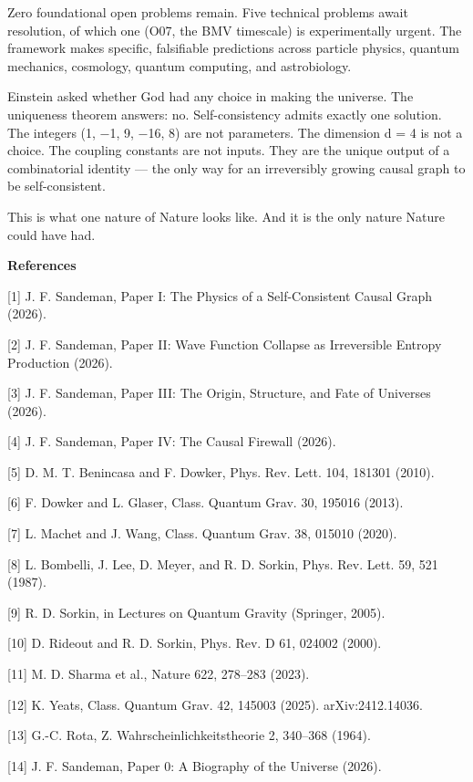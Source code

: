 \documentclass[12pt,a4paper]{article}
\begin{document}
Zero foundational open problems remain. Five technical problems await
resolution, of which one (O07, the BMV timescale) is experimentally
urgent. The framework makes specific, falsifiable predictions across
particle physics, quantum mechanics, cosmology, quantum computing, and
astrobiology.

Einstein asked whether God had any choice in making the universe. The
uniqueness theorem answers: no. Self-consistency admits exactly one
solution. The integers (1, −1, 9, −16, 8) are not parameters. The
dimension d = 4 is not a choice. The coupling constants are not inputs.
They are the unique output of a combinatorial identity --- the only way
for an irreversibly growing causal graph to be self-consistent.

This is what one nature of Nature looks like. And it is the only nature
Nature could have had.

\textbf{References}

{[}1{]} J. F. Sandeman, Paper I: The Physics of a Self-Consistent Causal
Graph (2026).

{[}2{]} J. F. Sandeman, Paper II: Wave Function Collapse as Irreversible
Entropy Production (2026).

{[}3{]} J. F. Sandeman, Paper III: The Origin, Structure, and Fate of
Universes (2026).

{[}4{]} J. F. Sandeman, Paper IV: The Causal Firewall (2026).

{[}5{]} D. M. T. Benincasa and F. Dowker, Phys. Rev. Lett. 104, 181301
(2010).

{[}6{]} F. Dowker and L. Glaser, Class. Quantum Grav. 30, 195016 (2013).

{[}7{]} L. Machet and J. Wang, Class. Quantum Grav. 38, 015010 (2020).

{[}8{]} L. Bombelli, J. Lee, D. Meyer, and R. D. Sorkin, Phys. Rev.
Lett. 59, 521 (1987).

{[}9{]} R. D. Sorkin, in Lectures on Quantum Gravity (Springer, 2005).

{[}10{]} D. Rideout and R. D. Sorkin, Phys. Rev. D 61, 024002 (2000).

{[}11{]} M. D. Sharma et al., Nature 622, 278--283 (2023).

{[}12{]} K. Yeats, Class. Quantum Grav. 42, 145003 (2025).
arXiv:2412.14036.

{[}13{]} G.-C. Rota, Z. Wahrscheinlichkeitstheorie 2, 340--368 (1964).

{[}14{]} J. F. Sandeman, Paper 0: A Biography of the Universe (2026).
\end{document}

